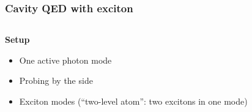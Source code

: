 \documentclass[t]{beamer}
\newcommand{\xmark}{\ding{55}}%
\begin{document}
\begin{frame}
\frametitle{Cavity QED with exciton}

\begin{columns}[T]
    \begin{column}{0.45\textwidth}
        \textbf{Setup}
        \begin{itemize}
            \item One active photon mode
            \item Probing by the side
            \item Exciton modes (``two-level atom'': \xmark two excitons in one mode)
        \end{itemize}
    \end{column}
    \begin{column}{0.55\textwidth}
        \begin{center}
            \begin{tikzpicture}[x=0.75pt,y=0.75pt,yscale=-0.8,xscale=0.8]
                

\end{tikzpicture}
\end{center}
\end{column}
\end{columns}
\end{frame}
\end{document}
